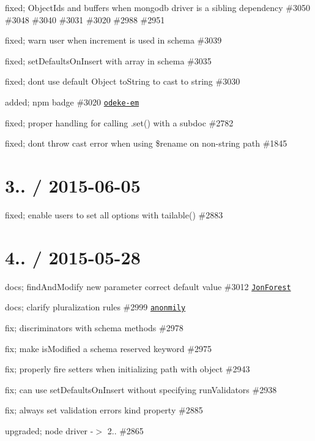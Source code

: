 \begin{DoxyItemize}
\item fixed; Object\+Ids and buffers when mongodb driver is a sibling dependency \#3050 \#3048 \#3040 \#3031 \#3020 \#2988 \#2951
\item fixed; warn user when \textquotesingle{}increment\textquotesingle{} is used in schema \#3039
\item fixed; set\+Defaults\+On\+Insert with array in schema \#3035
\item fixed; dont use default Object to\+String to cast to string \#3030
\item added; npm badge \#3020 \href{https://github.com/odeke-em}{\tt odeke-\/em}
\item fixed; proper handling for calling .set() with a subdoc \#2782
\item fixed; dont throw cast error when using \$rename on non-\/string path \#1845
\end{DoxyItemize}

\section*{3.. / 2015-\/06-\/05 }


\begin{DoxyItemize}
\item fixed; enable users to set all options with tailable() \#2883
\end{DoxyItemize}

\section*{4.. / 2015-\/05-\/28 }


\begin{DoxyItemize}
\item docs; find\+And\+Modify new parameter correct default value \#3012 \href{https://github.com/JonForest}{\tt Jon\+Forest}
\item docs; clarify pluralization rules \#2999 \href{https://github.com/anonmily}{\tt anonmily}
\item fix; discriminators with schema methods \#2978
\item fix; make {\ttfamily is\+Modified} a schema reserved keyword \#2975
\item fix; properly fire setters when initializing path with object \#2943
\item fix; can use {\ttfamily set\+Defaults\+On\+Insert} without specifying {\ttfamily run\+Validators} \#2938
\item fix; always set validation errors {\ttfamily kind} property \#2885
\item upgraded; node driver -\/$>$ 2.. \#2865
\end{DoxyItemize}

